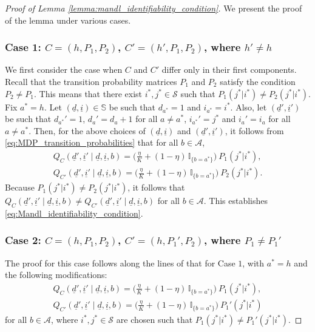 \begin{proof}[Proof of Lemma \ref{lemma:mandl_identifiability_condition}]
We present the proof of the lemma under various cases.
\subsubsection{Case 1: $C=(h, P_1, P_2)$, $C'=(h', P_1, P_2)$, where $h'\neq h$}
We first consider the case when $C$ and $C'$ differ only in their first components. Recall that the transition probability matrices $P_1$ and $P_2$ satisfy the condition $P_2\neq P_1$. This means that there exist $i^*, j^*\in \mathcal{S}$ such that $P_1(j^*|i^*) \neq P_2(j^*|i^*)$. Fix $a^*=h$. Let $(\underline{d}, \underline{i})\in \mathbb{S}$ be such that $d_{a^*}=1$ and $i_{a^*}=i^*$. Also, let $(\underline{d}', \underline{i}')$ be such that $d_{a^*}'=1$, $d_a'=d_a+1$ for all $a\neq a^*$, $i_{a^*}'=j^*$ and $i_a'=i_a$ for all $a\neq a^*$. Then, for the above choices of $(\underline{d}, \underline{i})$ and $(\underline{d}', \underline{i}')$, it follows from \eqref{eq:MDP_transition_probabilities} that for all $b\in \mathcal{A}$,
\begin{align}
	Q_C(\underline{d}', \underline{i}'\mid \underline{d}, \underline{i}, b)=\bigg(\frac{\eta}{K}+(1-\eta)\,\mathbb{I}_{\{b=a^*\}}\bigg)~P_1(j^*|i^*),\nonumber\\
	Q_{C'}(\underline{d}', \underline{i}'\mid \underline{d}, \underline{i}, b)=\bigg(\frac{\eta}{K}+(1-\eta)\,\mathbb{I}_{\{b=a^*\}}\bigg)~P_2(j^*|i^*).
	\label{eq:proof_of_mandl_identifiability_1}
\end{align}
Because $P_1(j^*|i^*) \neq P_2(j^*|i^*)$, it follows that $Q_C(\underline{d}', \underline{i}'\mid \underline{d}, \underline{i}, b) \neq Q_{C'}(\underline{d}', \underline{i}'\mid \underline{d}, \underline{i}, b)$ for all $b\in \mathcal{A}$. This establishes \eqref{eq:Mandl_identifiability_condition}.

\subsubsection{Case 2: $C=(h, P_1, P_2)$, $C'=(h, P_1', P_2)$, where $P_1\neq P_1'$}
The proof for this case follows along the lines of that for Case $1$, with $a^*=h$ and the following modifications:
\begin{align}
	Q_C(\underline{d}', \underline{i}'\mid \underline{d}, \underline{i}, b)=\bigg(\frac{\eta}{K}+(1-\eta)\,\mathbb{I}_{\{b=a^*\}}\bigg)~P_1(j^*|i^*),\nonumber\\
	Q_{C'}(\underline{d}', \underline{i}'\mid \underline{d}, \underline{i}, b)=\bigg(\frac{\eta}{K}+(1-\eta)\,\mathbb{I}_{\{b=a^*\}}\bigg)~P_1'(j^*|i^*)
	\label{eq:proof_of_mandl_identifiability_2}
\end{align}
for all $b\in \mathcal{A}$, where $i^*, j^*\in \mathcal{S}$ are chosen such that $P_1(j^*|i^*) \neq P_1'(j^*|i^*)$.


\end{proof}
